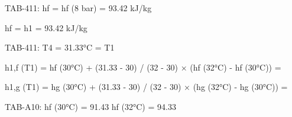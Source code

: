 TAB-411:  
hf = hf (8 bar) = 93.42 kJ/kg  

hf = h1 = 93.42 kJ/kg  

TAB-411:  
T4 = 31.33°C = T1  

h1,f (T1) = hf (30°C) + (31.33 - 30) / (32 - 30) × (hf (32°C) - hf (30°C)) =  

h1,g (T1) = hg (30°C) + (31.33 - 30) / (32 - 30) × (hg (32°C) - hg (30°C)) =  

TAB-A10:  
hf (30°C) = 91.43  
hf (32°C) = 94.33
